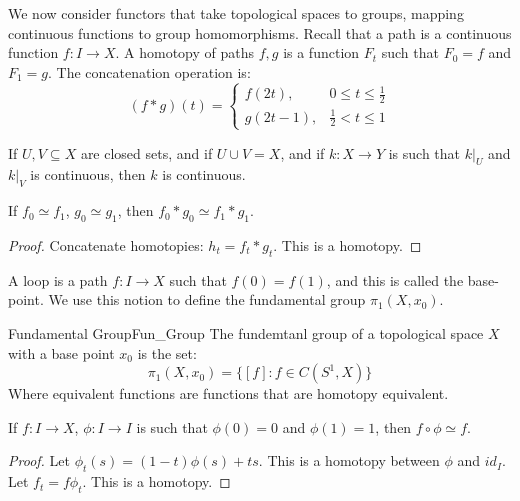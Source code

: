 \documentclass{book}                                                           %
\begin{document}
    We now consider functors that take topological spaces to
    groups, mapping continuous functions to group homomorphisms.
    Recall that a path is a continuous function $f:I\rightarrow{X}$.
    A homotopy of paths $f,g$ is a function $F_{t}$ such that
    $F_{0}=f$ and $F_{1}=g$. The concatenation operation is:
    \begin{equation}
        (f*g)(t)=
        \begin{cases}
            f(2t),&0\leq{t}\leq\frac{1}{2}\\
            g(2t-1),&\frac{1}{2}<t\leq{1}
        \end{cases}
    \end{equation}
    \begin{theorem}
        If $U,V\subseteq{X}$ are closed sets, and if
        $U\cup{V}=X$, and if $k:X\rightarrow{Y}$ is such that
        $k|_{U}$ and $k|_{V}$ is continuous, then $k$ is continuous.
    \end{theorem}
    \begin{theorem}
        If $f_{0}\simeq{f}_{1}$, $g_{0}\simeq{g}_{1}$, then
        $f_{0}*g_{0}\simeq{f}_{1}*g_{1}$.
    \end{theorem}
    \begin{proof}
        Concatenate homotopies: $h_{t}=f_{t}*g_{t}$. This is a
        homotopy.
    \end{proof}
    A loop is a path $f:I\rightarrow{X}$ such that $f(0)=f(1)$, and
    this is called the base-point. We use this notion to define the
    fundamental group $\pi_{1}(X,x_{0})$.
    \begin{ldefinition}{Fundamental Group}{Fun_Group}
        The fundemtanl group of a topological space $X$ with a
        base point $x_{0}$ is the set:
        \begin{equation}
            \pi_{1}(X,x_{0})=\{[f]:f\in{C}(S^{1},X)\}
        \end{equation}
        Where equivalent functions are functions that are homotopy
        equivalent.
    \end{ldefinition}
    \begin{theorem}
        If $f:I\rightarrow{X}$, $\phi:I\rightarrow{I}$ is such that
        $\phi(0)=0$ and $\phi(1)=1$, then $f\circ\phi\simeq{f}$.
    \end{theorem}
    \begin{proof}
        Let $\phi_{t}(s)=(1-t)\phi(s)+ts$. This is a homotopy between
        $\phi$ and $id_{I}$. Let $f_{t}=f\phi_{t}$. This is a
        homotopy.
    \end{proof}
\end{document}
